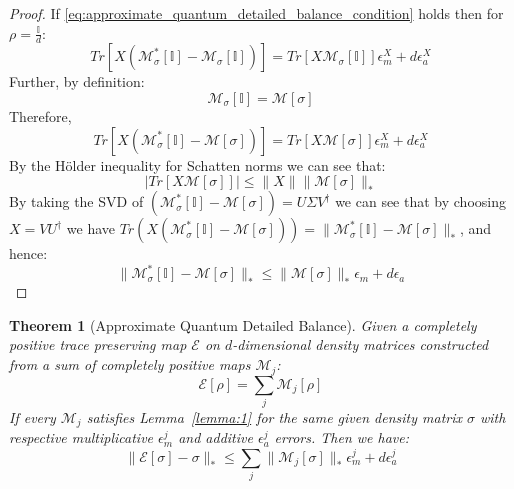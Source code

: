\documentclass[aps,floatfix,10pt,amssymb,amsfont,amsmath,superscriptaddress,float,nofootinbib,longbibliography,nobalancelastpage,twocolumn]{revtex4-2}
\newtheorem{theorem}{Theorem}
\begin{document}
\begin{proof}
    If \eqref{eq:approximate_quantum_detailed_balance_condition} holds then for $\rho = \frac{\mathbb{I}}{d}$:
    \begin{equation}
        Tr\left[X (\mathcal{M}^*_{\sigma}[\mathbb{I}]-\mathcal{M}_{\sigma}[\mathbb{I}])\right] = Tr\left[X\mathcal{M}_{\sigma}[\mathbb{I}]\right]\epsilon^{X}_m + d\epsilon^{X}_a
    \end{equation}
    Further, by definition:
    \begin{equation}
        \mathcal{M}_{\sigma}[\mathbb{I}] = \mathcal{M}[\sigma]
    \end{equation}
    Therefore,
    \begin{equation}
    \label{eq:lhs}
        Tr\left[X (\mathcal{M}^*_{\sigma}[\mathbb{I}]-\mathcal{M}[\sigma])\right] = Tr\left[X\mathcal{M}[\sigma]\right]\epsilon^{ X}_m + d\epsilon^{X}_a
    \end{equation}
    By the H\"older inequality for Schatten norms we can see that: 
        \begin{equation}
        |Tr[X\mathcal{M}[\sigma]]| \leq \|X\|\|\mathcal{M}[\sigma]\|_*
    \end{equation}
    By taking the SVD of $(\mathcal{M}^*_{\sigma}[\mathbb{I}]-\mathcal{M}[\sigma]) = U\Sigma V^{\dagger}$ we can see that by choosing $X = VU^{\dagger}$ we have $Tr(X(\mathcal{M}^*_{\sigma}[\mathbb{I}]-\mathcal{M}[\sigma])) = \|\mathcal{M}^*_{\sigma}[\mathbb{I}]-\mathcal{M}[\sigma]\|_*$, and hence:
    \begin{equation}
        \|\mathcal{M}^*_{\sigma}[\mathbb{I}]-\mathcal{M}[\sigma]\|_* \leq \|\mathcal{M}[\sigma]\|_*\epsilon_m + d\epsilon_a
    \end{equation}
\end{proof}
\begin{theorem}[Approximate Quantum Detailed Balance]
\label{theorem:quantumapproximatedeatildedbalance}
Given a completely positive trace preserving map $\mathcal{E}$ on $d$-dimensional density matrices constructed from a sum of completely positive maps $\mathcal{M}_j$:
\begin{equation}
    \mathcal{E}[\rho] = \sum_j \mathcal{M}_j[\rho]
\end{equation}
If every $\mathcal{M}_j$ satisfies Lemma~\ref{lemma:1} for the same given density matrix $\sigma$ with respective multiplicative $\epsilon_m^j$ and additive $\epsilon_a^j$ errors. Then we have:
\begin{equation}
     \|\mathcal{E}[\sigma]-\sigma\|_* \leq \sum_j\|\mathcal{M}_j[\sigma]\|_*\epsilon^j_m + d\epsilon^j_a
\end{equation}
\end{theorem}
\end{document}

